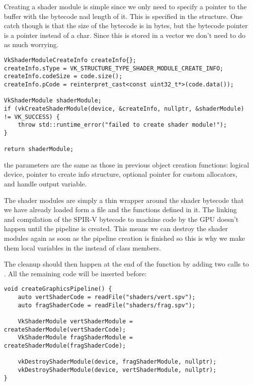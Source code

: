 \par Creating a shader module is simple since we only need to specify a pointer to the buffer with the bytecode nad length of it. This is specified in the  structure. One catch though is that the size of the bytecode is in bytes, but the bytecode pointer is a  pointer instead of a char. Since this is stored in a vector we don't need to do as much worrying.

\begin{center}
\begin{minipage}{0.95\linewidth}
\begin{lstlisting}
VkShaderModuleCreateInfo createInfo{};
createInfo.sType = VK_STRUCTURE_TYPE_SHADER_MODULE_CREATE_INFO;
createInfo.codeSize = code.size();
createInfo.pCode = reinterpret_cast<const uint32_t*>(code.data());

VkShaderModule shaderModule;
if (vkCreateShaderModule(device, &createInfo, nullptr, &shaderModule) != VK_SUCCESS) {
    throw std::runtime_error("failed to create shader module!");
}

return shaderModule;
\end{lstlisting}
\end{minipage}
\end{center}

\par the parameters are the same as those in previous object creation functions: logical device, pointer to create info structure, optional pointer for custom allocators, and handle output variable.

\par The shader modules are simply a thin wrapper around the shader bytecode that we have already loaded form a file and the functions defined in it. The linking and compilation of the SPIR-V bytecode to machine code by the GPU doesn't happen until the pipeline is created. This means we can destroy the shader modules again as soon as the pipeline creation is finished so this is why we make them local variables in the  instead of class members.

\par The cleanup should then happen at the end of the function by adding two calls to . All the remaining code will be inserted before:

\begin{center}
\begin{minipage}{0.95\linewidth}
\begin{lstlisting}
void createGraphicsPipeline() {
    auto vertShaderCode = readFile("shaders/vert.spv");
    auto fragShaderCode = readFile("shaders/frag.spv");

    VkShaderModule vertShaderModule = createShaderModule(vertShaderCode);
    VkShaderModule fragShaderModule = createShaderModule(fragShaderCode);

    vkDestroyShaderModule(device, fragShaderModule, nullptr);
    vkDestroyShaderModule(device, vertShaderModule, nullptr);
}
\end{lstlisting}
\end{minipage}
\end{center}

